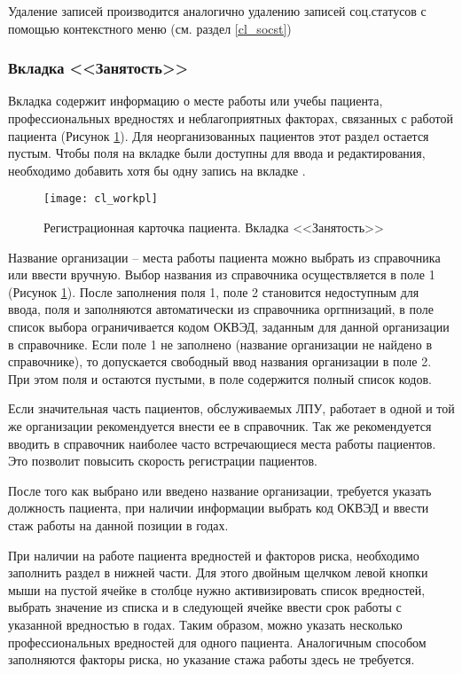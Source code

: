 Удаление записей производится аналогично удалению записей соц.статусов с помощью контекстного меню (см. раздел \ref{cl_socst})

\subsubsection{Вкладка <<Занятость>>}

Вкладка  содержит информацию о месте работы или учебы пациента, профессиональных вредностях и неблагоприятных факторах, связанных с работой пациента (Рисунок \ref{img_cl_workpl}). Для неорганизованных пациентов этот раздел остается пустым. Чтобы поля на вкладке  были доступны для ввода и редактирования, необходимо добавить хотя бы одну запись на вкладке .

\begin{figure}[ht]\centering
 \texttt{[image: cl\_workpl]}
 \caption{Регистрационная карточка пациента. Вкладка <<Занятость>>}
 \label{img_cl_workpl}
\end{figure} 

Название организации – места работы пациента можно выбрать из справочника или ввести вручную. Выбор названия из справочника осуществляется в поле 1 (Рисунок \ref{img_cl_workpl}). После заполнения поля 1, поле 2 становится недоступным для ввода, поля  и  заполняются автоматически из справочника оргпнизаций, в поле  список выбора ограничивается кодом ОКВЭД, заданным для данной организации в справочнике. Если поле 1 не заполнено (название организации не найдено в справочнике), то допускается свободный ввод названия организации в поле 2. При этом поля  и  остаются пустыми, в поле  содержится полный список кодов.

\begin{prim}
Если значительная часть пациентов, обслуживаемых ЛПУ, работает в одной и той же организации рекомендуется внести ее в справочник. Так же рекомендуется вводить в справочник наиболее часто встречающиеся места работы пациентов. Это позволит повысить скорость регистрации пациентов.
\end{prim}
 
После того как выбрано или введено название организации, требуется указать должность пациента, при наличии информации выбрать код ОКВЭД и ввести стаж работы на данной позиции в годах. 

При наличии на работе пациента вредностей и факторов риска, необходимо заполнить раздел  в нижней части. Для этого двойным щелчком левой кнопки мыши на пустой ячейке в столбце  нужно активизировать список вредностей, выбрать значение из списка и в следующей ячейке ввести срок работы с указанной вредностью в годах. Таким образом, можно указать несколько профессиональных вредностей для одного пациента. Аналогичным способом заполняются факторы риска, но указание стажа работы здесь не требуется.


